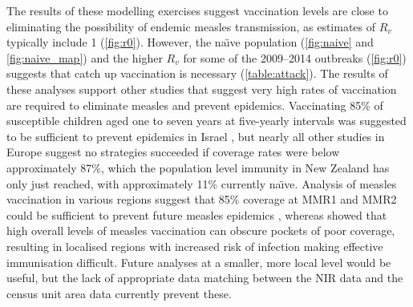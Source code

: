 \documentclass{article}
\begin{document}
The results of these modelling exercises suggest vaccination levels are close to eliminating the possibility of endemic measles transmission, as estimates of $R_v$ typically include 1 (\autoref{fig:r0}). However, the na\"{\i}ve population (\autoref{fig:naive} and \autoref{fig:naive_map}) and the higher $R_v$ for some of the 2009--2014 outbreaks (\autoref{fig:r0}) suggests that catch up vaccination is necessary (\autoref{table:attack}). The results of these analyses support other studies that suggest very high rates of vaccination are required to eliminate measles and prevent epidemics. Vaccinating 85\% of susceptible children aged one to seven years at five-yearly intervals was suggested to be sufficient to prevent epidemics in Israel \citep{agur93}, but nearly all other studies in Europe suggest no strategies succeeded if coverage rates were below approximately 87\%, which the population level immunity in New Zealand has only just reached, with approximately 11\% currently na\"{\i}ve. Analysis of measles vaccination in various regions suggest that 85\% coverage at MMR1 and MMR2 could be sufficient to prevent future measles epidemics \citep{agur93, babad95, edmunds0, gay98, wallinga1}, whereas \citep{glass4} showed that high overall levels of measles vaccination can obscure pockets of poor coverage, resulting in localised regions with increased risk of infection making effective immunisation difficult. Future analyses at a smaller, more local level would be useful, but the lack of appropriate data matching between the NIR data and the census unit area data currently prevent these.
\end{document}
